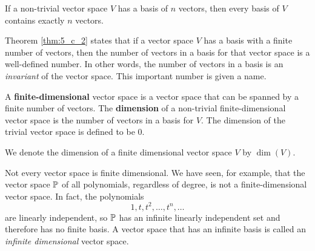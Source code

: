 \begin{theorem} \label{thm:5_c_2} If a non-trivial vector space $V$ has a basis of $n$ vectors, then every basis of $V$ contains exactly $n$ vectors.
\end{theorem}


Theorem \ref{thm:5_c_2} states that if a vector space $V$ has a basis with a finite number of vectors, then the number of vectors in a basis for that vector space is a well-defined number. In other words, the number of vectors in a basis is an \emph{invariant} of the vector space. This important number is given a name.


\begin{definition} A \textbf{finite-dimensional} vector space is a vector space that can be spanned by a finite number of vectors. The \textbf{dimension} of a non-trivial finite-dimensional vector space is the number of vectors in a basis for $V$. The dimension of the trivial vector space is defined to be 0.
\end{definition}


We denote the dimension of a finite dimensional vector space $V$ by $\dim(V)$.


Not every vector space is finite dimensional. We have seen, for example, that the vector space $\mathbb{P}$ of all polynomials, regardless of degree, is not a finite-dimensional vector space. In fact, the polynomials
\[1, t, t^2, \ldots, t^n, \ldots\]
are linearly independent, so $\mathbb{P}$ has an infinite linearly independent set and therefore has no finite basis. A vector space that has an infinite basis is called an \emph{infinite dimensional} vector space. 


